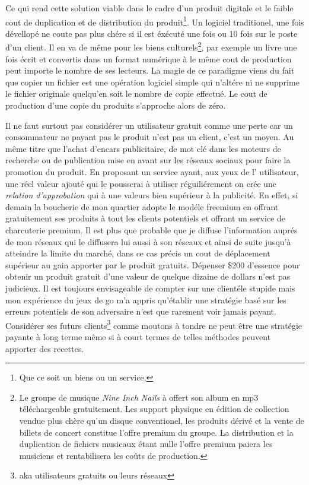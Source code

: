 \documentclass[11pt, a4paper ]{article}
\begin{document}
Ce qui rend cette solution viable dans le cadre d'un produit digitale et le faible cout de duplication et de distribution du produit\footnote{Que ce soit un biens ou un service.}. Un logiciel traditionel, une fois dévellopé ne coute pas plus chére si il est éxécuté une fois ou 10 fois sur le poste d'un client. Il en va de même pour les biens culturels\footnote{Le groupe de musique \emph{Nine Inch Nails} à offert son album en mp3 téléchargeable gratuitement. Les support physique en édition de collection vendue plus chère qu'un disque conventionel, les produits dérivé et la vente de billets de concert constitue l'offre premium du groupe. La distribution et la duplication de fichiers musicaux étant nulle l'offre premium paiera les musiciens et rentabilisera les coûts de production.}, par exemple un livre une fois écrit et convertis dans un format numérique à le même cout de production peut importe le nombre de ses lecteurs. La magie de ce paradigme viens du fait que copier un fichier est une opération logiciel simple qui n'altére ni ne supprime le fichier originale quelqu'en soit le nombre de copie effectué. Le cout de production d'une copie du produits s'approche alors de zéro.

Il ne faut surtout pas considérer un utilisateur gratuit comme une perte car un consommateur ne payant pas le produit n'est pas un client, c'est un moyen. Au même titre que l'achat d'encars publicitaire, de mot clé dans les moteurs de recherche ou de publication mise en avant sur les réseaux sociaux pour faire la promotion du produit. 
En proposant un service ayant, aux yeux de l' utilisateur, une réel valeur ajouté qui le pousserai à utiliser réguiliérement on crée une \emph{relation d'approbation} qui à une valeurs bien supérieur à la publicité. 
En effet, si demain la boucherie de mon quartier adopte le modéle freemium en offrant gratuitement ses produits à tout les clients potentiels et offrant un service de charcuterie premium. 
Il est plus que probable que je diffuse l'information auprés de mon réseaux qui le diffusera lui aussi à son réseaux et ainsi de suite jusqu'à atteindre la limite du marché, dans ce cas précis un cout de déplacement supérieur au gain apporter par le produit gratuits. 
Dépenser \$200 d'essence pour obtenir un produit gratuit d'une valeur de quelque dizaine de dollars n'est pas judicieux. Il est toujours envisageable de compter sur une clientéle stupide mais mon expérience du jeux de go m'a appris qu'établir une stratégie basé sur les erreurs potentiels de son adversaire n'est que rarement voir jamais payant. 
Considérer ses futurs clients\footnote{aka utilisateurs gratuits ou leurs réseaux} comme moutons à tondre ne peut être une stratégie payante à long terme même si à court termes de telles méthodes peuvent apporter des recettes.
\end{document}

